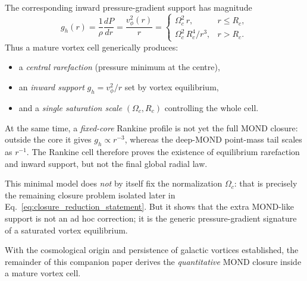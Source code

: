 \documentclass[11pt]{article}
\begin{document}
The corresponding inward pressure-gradient support has magnitude
\begin{equation}
g_h(r)=\frac{1}{\rho}\frac{dP}{dr}
=\frac{v_\phi^2(r)}{r}
=
\begin{cases}
\Omega_c^2\,r, & r\le R_c,\\[4pt]
\Omega_c^2\,R_c^4/r^3, & r>R_c.
\end{cases}
\label{eq:rankine_gh}
\end{equation}
Thus a mature vortex cell generically produces:
\begin{itemize}
\item a \emph{central rarefaction} (pressure minimum at the centre),
\item an \emph{inward support} $g_h=v_\phi^2/r$ set by vortex equilibrium,
\item and a \emph{single saturation scale} $(\Omega_c,R_c)$ controlling the
  whole cell.
\end{itemize}
At the same time, a \emph{fixed-core} Rankine profile is not yet the full
MOND closure: outside the core it gives $g_h\propto r^{-3}$, whereas the
deep-MOND point-mass tail scales as $r^{-1}$.  The Rankine cell therefore
proves the existence of equilibrium rarefaction and inward support, but
not the final global radial law.

This minimal model does \emph{not} by itself fix the normalization
$\Omega_c$: that is precisely the remaining closure problem isolated later
in Eq.~\eqref{eq:closure_reduction_statement}.  But it shows that the
extra MOND-like support is not an ad hoc correction; it is the generic
pressure-gradient signature of a saturated vortex equilibrium.

\medskip\noindent
With the cosmological origin and persistence of galactic vortices
established, the remainder of this companion paper derives the
\emph{quantitative} MOND closure inside a mature vortex cell.
\end{document}
